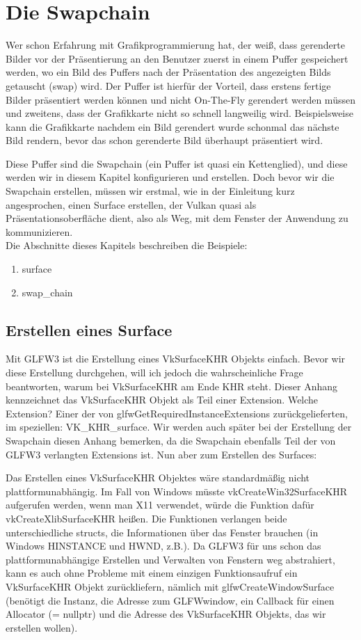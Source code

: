 \documentclass[11pt,a4paper]{report}
\begin{document}
\chapter{Die Swapchain}
Wer schon Erfahrung mit Grafikprogrammierung hat, der weiß, dass gerenderte Bilder vor der Präsentierung an den Benutzer zuerst in einem Puffer gespeichert werden, wo ein Bild des Puffers nach der Präsentation des angezeigten Bilds getauscht (swap) wird. Der Puffer ist hierfür der Vorteil, dass erstens fertige Bilder präsentiert werden können und nicht On-The-Fly gerendert werden müssen und zweitens, dass der Grafikkarte nicht so schnell langweilig wird. Beispielsweise kann die Grafikkarte nachdem ein Bild gerendert wurde schonmal das nächste Bild rendern, bevor das schon gerenderte Bild überhaupt präsentiert wird.

Diese Puffer sind die Swapchain (ein Puffer ist quasi ein Kettenglied), und diese werden wir in diesem Kapitel konfigurieren und erstellen. Doch bevor wir die Swapchain erstellen, müssen wir erstmal, wie in der Einleitung kurz angesprochen, einen Surface erstellen, der Vulkan quasi als Präsentationsoberfläche dient, also als Weg, mit dem Fenster der Anwendung zu kommunizieren.\\
Die Abschnitte dieses Kapitels beschreiben die Beispiele:
\begin{enumerate}
	\item surface
	\item swap\_chain
\end{enumerate}

\section{Erstellen eines Surface}
Mit GLFW3 ist die Erstellung eines VkSurfaceKHR Objekts einfach. Bevor wir diese Erstellung durchgehen, will ich jedoch die wahrscheinliche Frage beantworten, warum bei VkSurfaceKHR am Ende KHR steht. Dieser Anhang kennzeichnet das VkSurfaceKHR Objekt als Teil einer Extension. Welche Extension? Einer der von glfwGetRequiredInstanceExtensions zurückgelieferten, im speziellen: VK\_KHR\_surface. Wir werden auch später bei der Erstellung der Swapchain diesen Anhang bemerken, da die Swapchain ebenfalls Teil der von GLFW3 verlangten Extensions ist. Nun aber zum Erstellen des Surfaces:

Das Erstellen eines VkSurfaceKHR Objektes wäre standardmäßig nicht plattformunabhängig. Im Fall von Windows müsste vkCreateWin32SurfaceKHR aufgerufen werden, wenn man X11 verwendet, würde die Funktion dafür vkCreateXlibSurfaceKHR heißen. Die Funktionen verlangen beide unterschiedliche structs, die Informationen über das Fenster brauchen (in Windows HINSTANCE und HWND, z.B.). Da GLFW3 für uns schon das plattformunabhängige Erstellen und Verwalten von Fenstern weg abstrahiert, kann es auch ohne Probleme mit einem einzigen Funktionsaufruf ein VkSurfaceKHR Objekt zurückliefern, nämlich mit glfwCreateWindowSurface (benötigt die Instanz, die Adresse zum GLFWwindow, ein Callback für einen Allocator (= nullptr) und die Adresse des VkSurfaceKHR Objekts, das wir erstellen wollen).
\end{document}
